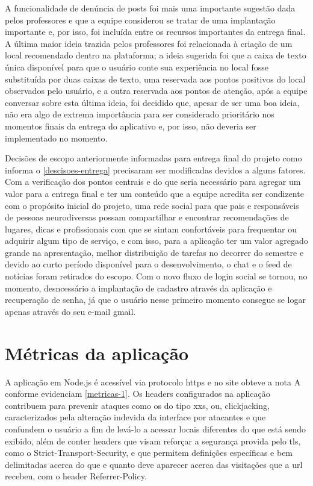 A funcionalidade de denúncia de posts foi mais uma importante sugestão dada pelos professores e que a equipe considerou se tratar de uma implantação importante e, por isso, foi incluída entre os recursos importantes da entrega final. A última maior ideia trazida pelos professores foi relacionada à criação de um local recomendado dentro na plataforma; a ideia sugerida foi que a caixa de texto única disponível para que o usuário conte sua experiência no local fosse substituída por duas caixas de texto, uma reservada aos pontos positivos do local observados pelo usuário, e a outra reservada aos pontos de atenção, após a equipe conversar sobre esta última ideia, foi decidido que, apesar de ser uma boa ideia, não era algo de extrema importância para ser considerado prioritário nos momentos finais da entrega do aplicativo e, por isso, não deveria ser implementado no momento.

Decisões de escopo anteriormente informadas para entrega final do projeto como informa o \autoref{descisoes-entrega} precisaram ser modificadas devidos a alguns fatores. Com a verificação dos pontos centrais e do que seria necessário para agregar um valor para a entrega final e ter um conteúdo que a equipe acredita ser condizente com o propósito inicial do projeto, uma rede social para que pais e responsáveis de pessoas neurodiversas possam compartilhar e encontrar recomendações de lugares, dicas e profissionais com que se sintam confortáveis para frequentar ou adquirir algum tipo de serviço, e com isso, para a aplicação ter um valor agregado grande na apresentação, melhor distribuição de tarefas no decorrer do semestre e devido ao curto período disponível para o desenvolvimento, o chat e o feed de notícias foram retirados do escopo. Com o novo fluxo de login social se tornou, no momento, desncessário a implantação de cadastro através da aplicação e recuperação de senha, já que o usuário nesse primeiro momento consegue se logar apenas através do seu e-mail gmail. 
 
\section{Métricas da aplicação}

A aplicação em Node.js é acessível via protocolo \ac{https} e no site   obteve a nota A conforme evidenciam \autoref{metricas-1}. Os headers configurados na aplicação contribuem para prevenir ataques como os do tipo \ac{xxs}, ou, clickjacking,  caracterizados pela alteração indevida da interface por atacantes e que confundem o usuário a fim de levá-lo a acessar locais diferentes do que está sendo exibido, além de conter headers que visam reforçar a segurança provida pelo \ac{tls}, como o Strict-Transport-Security, e que permitem definições específicas e bem delimitadas acerca do que e quanto deve aparecer acerca das visitações que a \ac{url} recebeu, com o header Referrer-Policy. 


